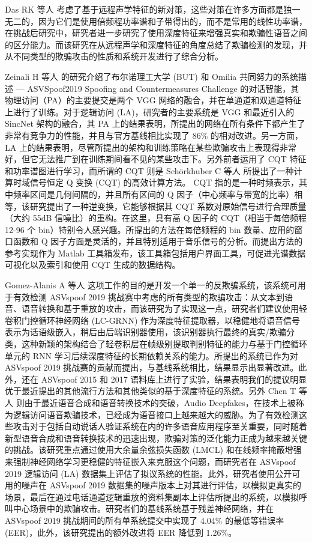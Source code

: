 Das RK 等人 \cite{das2019long} 考虑了基于远程声学特征的新对策，这些对策在许多方面都是独一无二的，因为它们是使用倍频程功率谱和子带得出的，而不是常用的线性功率谱，在挑战后研究中，研究者进一步研究了使用深度特征来增强真实和欺骗性语音之间的区分能力。而该研究在从远程声学和深度特征的角度总结了欺骗检测的发现，并从不同类型的欺骗攻击的性质和系统开发进行了综合分析。

Zeinali H 等人 \cite{zeinali2019detecting} 的研究介绍了布尔诺理工大学 (BUT) 和 Omilia 共同努力的系统描述 — ASVSpoof2019 Spoofing and Countermeasures Challenge 的对话智能，其物理访问（PA）的主要提交是两个 VGG 网络的融合，并在单通道和双通道特征上进行了训练。对于逻辑访问 (LA)，研究者的主要系统是 VGG 和最近引入的 SincNet 架构的融合，其 PA 上的结果表明，所提出的网络在所有条件下都产生了非常有竞争力的性能，并且与官方基线相比实现了 86\% 的相对改进。另一方面，LA 上的结果表明，尽管所提出的架构和训练策略在某些欺骗攻击上表现得非常好，但它无法推广到在训练期间看不见的某些攻击下。另外前者运用了 CQT 特征和功率谱图进行学习，而所谓的 CQT  则是 Schörkhuber C 等人 \cite{schorkhuber2010constant} 所提出了一种计算时域信号恒定 Q 变换 (CQT) 的高效计算方法。 CQT 指的是一种时频表示，其中频率区间是几何间隔的，并且所有区间的 Q 因子（中心频率与带宽的比率）相等，该研究提出了一种逆变换，它能够根据其 CQT 系数对原始信号进行合理质量（大约 55dB 信噪比）的重构。在这里，具有高 Q 因子的 CQT（相当于每倍频程 12-96 个 bin）特别令人感兴趣。所提出的方法在每倍频程的 bin 数量、应用的窗口函数和 Q 因子方面是灵活的，并且特别适用于音乐信号的分析。而提出方法的参考实现作为 Matlab 工具箱发布，该工具箱包括用户界面工具，可促进光谱数据可视化以及索引和使用 CQT 生成的数据结构。

Gomez-Alanis A 等人 \cite{gomez2019light} 这项工作的目的是开发一个单一的反欺骗系统，该系统可用于有效检测 ASVspoof 2019 挑战赛中考虑的所有类型的欺骗攻击：从文本到语音、语音转换和基于重放的攻击，而该研究为了实现这一点，研究者们建议使用轻卷积门控循环神经网络 (LC-GRNN) 作为深度特征提取器，以稳健地将语音信号表示为话语级嵌入，稍后由后端识别器使用，该识别器执行最终的真实/欺骗分类，这种新颖的架构结合了轻卷积层在帧级别提取判别特征的能力与基于门控循环单元的 RNN 学习后续深度特征的长期依赖关系的能力。所提出的系统已作为对 ASVspoof 2019 挑战赛的贡献而提出，与基线系统相比，结果显示出显著改进。此外，还在 ASVspoof 2015 和 2017 语料库上进行了实验，结果表明我们的提议明显优于最近提出的其他流行方法和其他类似的基于深度特征的系统。另外 Chen T 等人 \cite{chen2020generalization} 则由于最近语音合成和语音转换技术的突破，Audio Deepfakes，在技术上被称为逻辑访问语音欺骗技术，已经成为语音接口上越来越大的威胁。为了有效检测这些攻击对于包括自动说话人验证系统在内的许多语音应用程序至关重要，同时随着新型语音合成和语音转换技术的迅速出现，欺骗对策的泛化能力正成为越来越关键的挑战。该研究重点通过使用大余量余弦损失函数 (LMCL) 和在线频率掩蔽增强来强制神经网络学习更稳健的特征嵌入来克服这个问题，而研究者在 ASVspoof 2019 逻辑访问 (LA) 数据集上评估了拟议系统的性能。此外，研究者使用公开可用的噪声在 ASVspoof 2019 数据集的噪声版本上对其进行评估，以模拟更真实的场景，最后在通过电话通道逻辑重放的资料集副本上评估所提出的系统，以模拟呼叫中心场景中的欺骗攻击。研究者们的基线系统基于残差神经网络，并在 ASVspoof 2019 挑战期间的所有单系统提交中实现了 4.04\% 的最低等错误率 (EER)，此外，该研究提出的额外改进将 EER 降低到 1.26\%。

